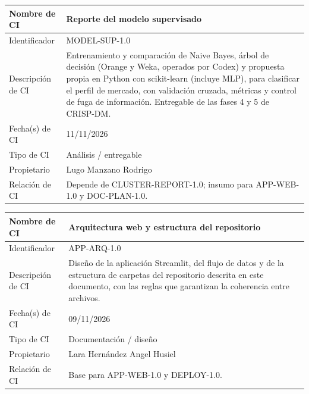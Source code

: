 \documentclass[letterpaper,11pt]{article}
\begin{document}
\noindent\begin{minipage}{\textwidth}
\small\renewcommand{\arraystretch}{1.9}
\begin{tabularx}{\textwidth}{|p{3.3cm}|Y|}
\hline
Nombre de CI & Reporte del modelo supervisado \\ \hline
Identificador & MODEL-SUP-1.0 \\ \hline
Descripción de CI & Entrenamiento y comparación de Naive Bayes, árbol de decisión (Orange y Weka, operados por Codex) y propuesta propia en Python con scikit-learn (incluye MLP), para clasificar el perfil de mercado, con validación cruzada, métricas y control de fuga de información. Entregable de las fases 4 y 5 de CRISP-DM. \\ \hline
Fecha(s) de CI & 11/11/2026 \\ \hline
Tipo de CI & Análisis / entregable \\ \hline
Propietario & Lugo Manzano Rodrigo \\ \hline
Relación de CI & Depende de CLUSTER-REPORT-1.0; insumo para APP-WEB-1.0 y DOC-PLAN-1.0. \\ \hline
\end{tabularx}
\end{minipage}\par\bigskip
\noindent\begin{minipage}{\textwidth}
\small\renewcommand{\arraystretch}{1.9}
\begin{tabularx}{\textwidth}{|p{3.3cm}|Y|}
\hline
Nombre de CI & Arquitectura web y estructura del repositorio \\ \hline
Identificador & APP-ARQ-1.0 \\ \hline
Descripción de CI & Diseño de la aplicación Streamlit, del flujo de datos y de la estructura de carpetas del repositorio descrita en este documento, con las reglas que garantizan la coherencia entre archivos. \\ \hline
Fecha(s) de CI & 09/11/2026 \\ \hline
Tipo de CI & Documentación / diseño \\ \hline
Propietario & Lara Hernández Angel Husiel \\ \hline
Relación de CI & Base para APP-WEB-1.0 y DEPLOY-1.0. \\ \hline
\end{tabularx}
\end{minipage}\par\bigskip
\end{document}
